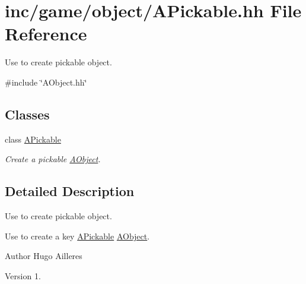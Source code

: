 \hypertarget{APickable_8hh}{}\section{inc/game/object/\+A\+Pickable.hh File Reference}
\label{APickable_8hh}


Use to create pickable object.  


{\ttfamily \#include \char`\"{}A\+Object.\+hh\char`\"{}}\newline
\subsection*{Classes}
\begin{DoxyCompactItemize}
\item 
class \hyperlink{classAPickable}{A\+Pickable}
\begin{DoxyCompactList}\small\item\em Create a pickable \hyperlink{classAObject}{A\+Object}. \end{DoxyCompactList}\end{DoxyCompactItemize}


\subsection{Detailed Description}
Use to create pickable object. 

Use to create a key \hyperlink{classAPickable}{A\+Pickable} \hyperlink{classAObject}{A\+Object}.

\begin{DoxyAuthor}{Author}
Hugo Ailleres 
\end{DoxyAuthor}
\begin{DoxyVersion}{Version}
1. 
\end{DoxyVersion}
